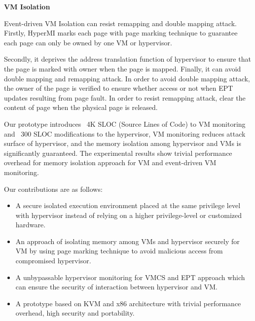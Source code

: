 \documentclass[conference]{IEEEtran}
\begin{document}
\textbf{VM Isolation}

Event-driven VM Isolation can resist remapping and double mapping attack.
Firstly, HyperMI marks each page with page marking technique to guarantee each page can only be owned by one VM or hypervisor.

Secondly, it deprives the address translation function of hypervisor to ensure that the page is marked with owner when the page is mapped. 
Finally, it can avoid double mapping and remapping attack. In order to avoid double mapping attack, the owner of the page is verified to ensure whether access or not when EPT updates resulting from page fault. In order to resist remapping attack, clear the content of page when the physical page is released.



Our prototype introduces ~4K SLOC (Source Lines of Code) to VM monitoring and ~300 SLOC modifications to the hypervisor, VM monitoring reduces attack surface of hypervisor, and the memory isolation among hypervisor and VMs is significantly guaranteed. The experimental results show trivial performance overhead for memory isolation approach for VM and event-driven VM monitoring.


Our contributions are as follows:
\begin{itemize}
\item A secure isolated execution environment placed at the same privilege level with hypervisor instead of relying on a higher privilege-level or customized hardware.
\item{An approach of isolating memory among VMs and hypervisor securely for VM by using page marking technique to avoid malicious access from compromised hypervisor.}

\item{A unbypassable hypervisor monitoring for VMCS and EPT approach  which can ensure the security of interaction between hypervisor and VM.}

\item{A prototype based on KVM and x86 architecture with trivial performance overhead, high security and portability.}

\end{itemize}
\end{document}
